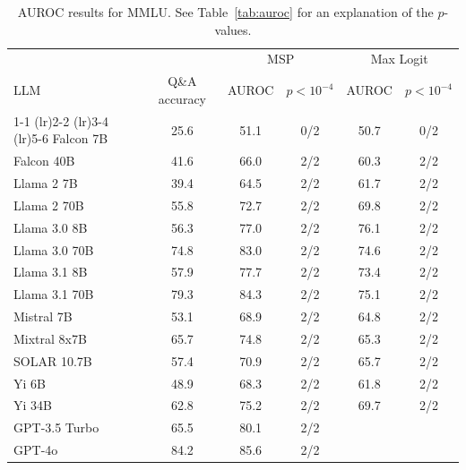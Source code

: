 \begin{table}[h]
\caption{AUROC results for MMLU. See Table~\ref{tab:auroc} for an explanation of the $p$-values.}
\label{tab:auroc_max}
\centering
\begin{tabular}{lccccc}
\toprule
& & \multicolumn{2}{c}{MSP} & \multicolumn{2}{c}{Max Logit} \\ 
LLM & Q\&A accuracy & AUROC & $p < 10^{-4}$ & AUROC & $p < 10^{-4}$ \\ 
\cmidrule(lr){1-1} \cmidrule(lr){2-2} \cmidrule(lr){3-4} \cmidrule(lr){5-6} 
Falcon 7B & 25.6 & 51.1 & 0/2 & 50.7 & 0/2\\
Falcon 40B & 41.6 & 66.0 & 2/2 & 60.3 & 2/2\\
Llama 2 7B & 39.4 & 64.5 & 2/2 & 61.7 & 2/2\\
Llama 2 70B & 55.8 & 72.7 & 2/2 & 69.8 & 2/2\\
Llama 3.0 8B & 56.3 & 77.0 & 2/2 & 76.1 & 2/2\\
Llama 3.0 70B & 74.8 & 83.0 & 2/2 & 74.6 & 2/2\\
Llama 3.1 8B & 57.9 & 77.7 & 2/2 & 73.4 & 2/2\\
Llama 3.1 70B & 79.3 & 84.3 & 2/2 & 75.1 & 2/2\\
Mistral 7B & 53.1 & 68.9 & 2/2 & 64.8 & 2/2\\
Mixtral 8x7B & 65.7 & 74.8 & 2/2 & 65.3 & 2/2\\
SOLAR 10.7B & 57.4 & 70.9 & 2/2 & 65.7 & 2/2\\
Yi 6B & 48.9 & 68.3 & 2/2 & 61.8 & 2/2\\
Yi 34B & 62.8 & 75.2 & 2/2 & 69.7 & 2/2\\
GPT-3.5 Turbo & 65.5 & 80.1 & 2/2 &  & \\
GPT-4o & 84.2 & 85.6 & 2/2 &  & \\
\bottomrule
\end{tabular}
\end{table}
